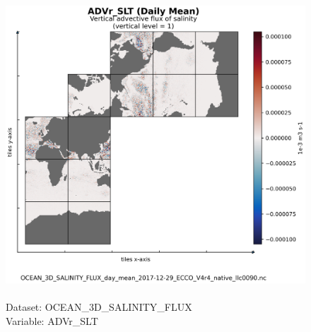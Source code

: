 \begin{figure}[H]
\centering
\includegraphics[scale=0.5]{../images/plots/native_plots/Ocean_Three-Dimensional_Salinity_Fluxes/ADVr_SLT.png}
\caption{\\Dataset: OCEAN\_3D\_SALINITY\_FLUX\\Variable: ADVr\_SLT}
\label{tab:table-OCEAN_3D_SALINITY_FLUX_ADVr_SLT-Plot}
\end{figure}
\pagebreak
